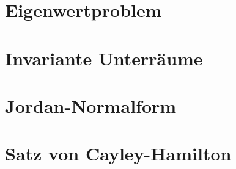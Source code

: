 %
%
%





                                                              

\section{Eigenwertproblem}

\section{Invariante Unterräume}

\section{Jordan-Normalform}

\section{Satz von Cayley-Hamilton}


